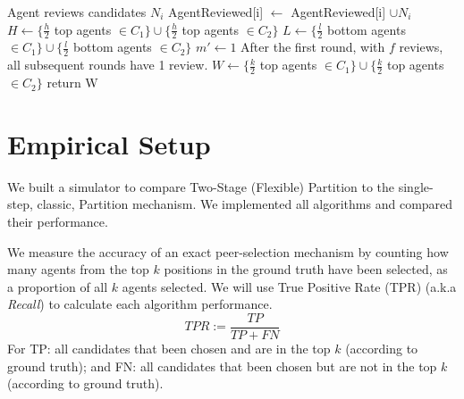\documentclass[letterpaper]{article} %
\begin{document}
\begin{algorithm}[t]
\begin{algorithmic}[1]
 \State Agent reviews candidates $N_{i}$ %
 \State AgentReviewed[i] $\gets$ AgentReviewed[i] $\cup N_{i}$
 \EndFor
 \State $H \gets \{ \frac{h}{2}$ top agents $\in C_{1} \} \cup \{ \frac{h}{2}$ top agents $\in C_{2} \}$
 \State $L \gets \{\frac{l}{2}$ bottom agents $\in C_{1} \} \cup \{ \frac{l}{2}$ bottom agents $\in C_{2} \}$
 \State $m' \gets1$ \Comment After the first round, with $f$ reviews, all subsequent rounds have 1 review.
\EndFor
\State $W \gets \{ \frac{k}{2}$ top agents $\in C_{1} \} \cup \{ \frac{k}{2}$ top agents $\in C_{2} \}$
\State return W
\end{algorithmic}
\end{algorithm}
\normalsize

\section{Empirical Setup}\label{setup}

We built a simulator to compare Two-Stage (Flexible) Partition to the single-step, classic, Partition mechanism. We implemented all algorithms and compared their performance.

We measure the accuracy of an exact peer-selection mechanism by counting how many agents from the top $k$ positions in the ground truth have been selected, as a proportion of all $k$ agents selected. We will use True Positive Rate (TPR) (a.k.a \emph{Recall}) to calculate each algorithm performance.
\small
$$
 TPR := \frac{TP}{TP + FN}
$$
\normalsize
For TP: all candidates that been chosen and are in the top $k$ (according to ground truth); and 
FN: all candidates that been chosen but are not in the top $k$ (according to ground truth).
\end{document}
